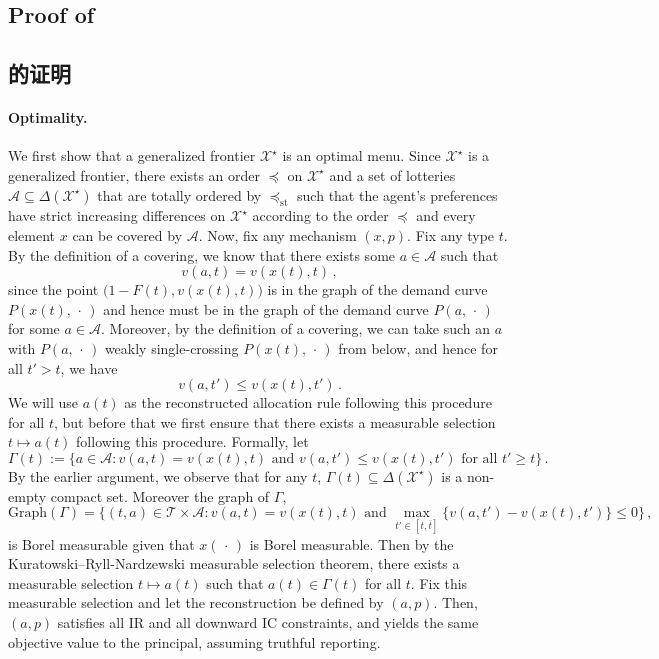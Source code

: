 \documentclass[12pt,letterpaper]{article}
\newenvironment{original}{\color{black}\noindent}{}
\newenvironment{translation}{\color{blue}\noindent}{}
\theoremstyle{plain}
\theoremstyle{definition}
\theoremstyle{remark}
\renewcommand{\1}{\mathds{1}}
\newcommand{\X}{\mathcal{X}}
\theoremstyle{definition}
\begin{document}
\begin{original}
\subsection{Proof of }
\end{original}
\begin{translation}
\subsection{的证明}
\end{translation}

\paragraph{Optimality.}\hspace{-2mm}\begin{original}We first show that a generalized frontier $\X^\star$ is an optimal menu. Since $\X^\star$ is a generalized frontier, there exists an order $\preceq$ on $\X^\star$ and a set of lotteries $\mathcal{A} \subseteq \Delta(\X^\star)$ that are totally ordered by $\preceq_{\text{st}}$ such that the agent's preferences have strict increasing differences on $\X^\star$ according to the order $\preceq$ and every element $x$ can be covered by $\mathcal{A}$. Now, fix any mechanism $(x, p)$. Fix any type $t$. By the definition of a covering, we know that there exists some $a \in \mathcal{A}$ such that
\[v(a, t) = v(x(t), t)\,,\]
since the point $\big(1 - F(t), v(x(t), t)\big)$ is in the graph of the demand curve $P(x(t), \,\cdot\,)$ and hence must be in the graph of the demand curve $P(a, \,\cdot\,)$ for some $a \in \mathcal{A}$. Moreover, by the definition of a covering, we can take such an $a$ with $P(a, \,\cdot\,)$ weakly single-crossing $P(x(t), \,\cdot\,)$ from below, and hence for all $t' > t$, we have
\[v(a, t') \leq v(x(t), t')\,.\]
We will use $a(t)$ as the reconstructed allocation rule following this procedure for all $t$, but before that we first ensure that there exists a measurable selection $t \mapsto a(t)$ following this procedure. Formally, let
\[\Gamma(t):= \Big\{a \in \mathcal{A}: v(a, t) = v(x(t), t) \text{ and } v(a, t') \leq v(x(t), t') \text{ for all $t' \geq t$} \Big\}\,.\]
By the earlier argument, we observe that for any $t$, $\Gamma(t) \subseteq \Delta(\X^\star)$ is a non-empty compact set.  Moreover the graph of $\Gamma$,
\[\text{Graph}(\Gamma) = \Big\{(t, a) \in \mathcal{T} \times \mathcal{A}: v(a, t) = v(x(t), t) \text{ and } \max_{t' \in [t, \overline{t}]} \big\{v(a, t') - v(x(t), t')\big\} \leq 0  \Big\}\,,\]
is Borel measurable given that $x(\,\cdot\,)$ is Borel measurable. Then by the Kuratowski--Ryll-Nardzewski measurable selection theorem, there exists a measurable selection $t \mapsto a(t)$ such that $a(t) \in \Gamma(t)$ for all $t$. Fix this measurable selection and let the reconstruction be defined by $(a, p)$. Then, $(a, p)$ satisfies all IR and all downward IC constraints, and yields the same objective value to the principal, assuming truthful reporting.
\end{original}
\end{document}
